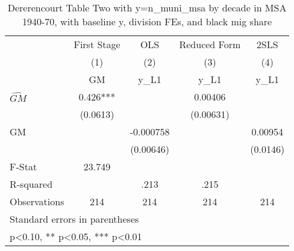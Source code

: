 \begin{table}[htbp]\centering
\def\sym#1{\ifmmode^{#1}\else\(^{#1}\)\fi}
\caption{Dererencourt Table Two with y=n\_muni\_msa by decade in MSA 1940-70, with baseline y, division FEs, and black mig share}
\begin{tabular}{l*{4}{c}}
\toprule
                    & First Stage   &         OLS   &Reduced Form   &        2SLS   \\
                    &\multicolumn{1}{c}{(1)}&\multicolumn{1}{c}{(2)}&\multicolumn{1}{c}{(3)}&\multicolumn{1}{c}{(4)}\\
                    &\multicolumn{1}{c}{GM}&\multicolumn{1}{c}{y\_L1}&\multicolumn{1}{c}{y\_L1}&\multicolumn{1}{c}{y\_L1}\\
\midrule
$\hat{GM}$          &       0.426***&               &     0.00406   &               \\
                    &    (0.0613)   &               &   (0.00631)   &               \\
\addlinespace
GM                  &               &   -0.000758   &               &     0.00954   \\
                    &               &   (0.00646)   &               &    (0.0146)   \\
\midrule
F-Stat              &      23.749   &               &               &               \\
R-squared           &               &        .213   &        .215   &               \\
Observations        &         214   &         214   &         214   &         214   \\
\bottomrule
\multicolumn{5}{l}{\footnotesize Standard errors in parentheses}\\
\multicolumn{5}{l}{\footnotesize * p<0.10, ** p<0.05, *** p<0.01}\\
\end{tabular}
\end{table}
